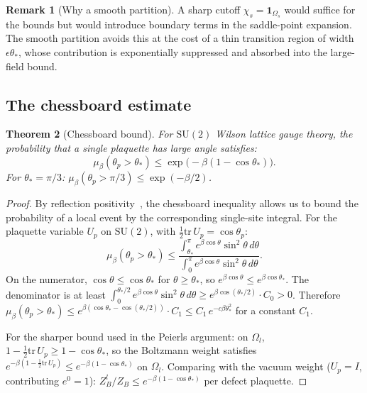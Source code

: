 \documentclass[11pt]{article}
\newtheorem{theorem}{Theorem}[section]
\theoremstyle{definition}
\newtheorem{remark}[theorem]{Remark}
\newcommand{\SU}{\mathrm{SU}}
\newcommand{\tr}{\mathrm{tr}}
\begin{document}
\begin{remark}[Why a smooth partition]
A sharp cutoff $\chi_s=\mathbf{1}_{\Omega_s}$ would suffice for the
bounds but would introduce boundary terms in the saddle-point expansion.
The smooth partition avoids this at the cost of a thin transition region
of width $\epsilon\theta_*$, whose contribution is exponentially
suppressed and absorbed into the large-field bound.
\end{remark}

\subsection{The chessboard estimate}

\begin{theorem}[Chessboard bound]\label{thm:chess}
For $\SU(2)$ Wilson lattice gauge theory, the probability that a single
plaquette has large angle satisfies:
\begin{equation}\label{eq:chess}
\mu_\beta(\theta_p>\theta_*)
\le\exp\bigl(-\beta(1-\cos\theta_*)\bigr).
\end{equation}
For $\theta_*=\pi/3$: $\mu_\beta(\theta_p>\pi/3)
\le\exp(-\beta/2)$.
\end{theorem}

\begin{proof}
By reflection positivity~\cite{OS78,FroehlichSimon}, the chessboard
inequality allows us to bound the probability of a local event by
the corresponding single-site integral.  For the plaquette variable
$U_p$ on $\SU(2)$, with $\frac{1}{2}\tr\,U_p=\cos\theta_p$:
\begin{equation}
\mu_\beta(\theta_p>\theta_*)
\le\frac{\int_{\theta_*}^\pi
e^{\beta\cos\theta}\sin^2\theta\,d\theta}
{\int_0^\pi e^{\beta\cos\theta}\sin^2\theta\,d\theta}.
\end{equation}
On the numerator, $\cos\theta\le\cos\theta_*$ for
$\theta\ge\theta_*$, so
$e^{\beta\cos\theta}\le e^{\beta\cos\theta_*}$.
The denominator is at least
$\int_0^{\theta_*/2}e^{\beta\cos\theta}\sin^2\theta\,d\theta
\ge e^{\beta\cos(\theta_*/2)}\cdot C_0>0$.
Therefore
$\mu_\beta(\theta_p>\theta_*)
\le e^{\beta(\cos\theta_*-\cos(\theta_*/2))}\cdot C_1
\le C_1\,e^{-c\beta\theta_*^2}$ for a constant $C_1$.

For the sharper bound used in the Peierls argument:
on $\Omega_l$, $1-\frac{1}{2}\tr\,U_p\ge 1-\cos\theta_*$, so the
Boltzmann weight satisfies
$e^{-\beta(1-\frac{1}{2}\tr\,U_p)}
\le e^{-\beta(1-\cos\theta_*)}$ on $\Omega_l$.  Comparing with the
vacuum weight ($U_p=I$, contributing $e^0=1$):
$Z_B^l/Z_B\le e^{-\beta(1-\cos\theta_*)}$ per defect plaquette.
\end{proof}
\end{document}
